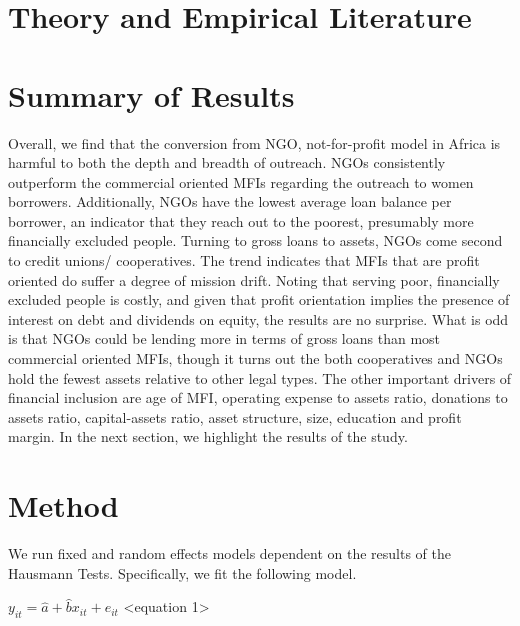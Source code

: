 \documentclass[
]{article}
\begin{document}
\hypertarget{theory-and-empirical-literature}{%
\section{\texorpdfstring{\textbf{Theory and Empirical
Literature}}{Theory and Empirical Literature}}\label{theory-and-empirical-literature}}

\hypertarget{summary-of-results}{%
\section{\texorpdfstring{\textbf{Summary of
Results}}{Summary of Results}}\label{summary-of-results}}

Overall, we find that the conversion from NGO, not-for-profit model in
Africa is harmful to both the depth and breadth of outreach. NGOs
consistently outperform the commercial oriented MFIs regarding the
outreach to women borrowers. Additionally, NGOs have the lowest average
loan balance per borrower, an indicator that they reach out to the
poorest, presumably more financially excluded people. Turning to gross
loans to assets, NGOs come second to credit unions/ cooperatives. The
trend indicates that MFIs that are profit oriented do suffer a degree of
mission drift. Noting that serving poor, financially excluded people is
costly, and given that profit orientation implies the presence of
interest on debt and dividends on equity, the results are no surprise.
What is odd is that NGOs could be lending more in terms of gross loans
than most commercial oriented MFIs, though it turns out the both
cooperatives and NGOs hold the fewest assets relative to other legal
types. The other important drivers of financial inclusion are age of
MFI, operating expense to assets ratio, donations to assets ratio,
capital-assets ratio, asset structure, size, education and profit
margin. In the next section, we highlight the results of the study.

\hypertarget{method}{%
\section{\texorpdfstring{\textbf{Method}}{Method}}\label{method}}

We run fixed and random effects models dependent on the results of the
Hausmann Tests. Specifically, we fit the following model.

\(y_{it} = \hat{a} + \hat{b}x_{it} + e_{it}\) \textless equation
1\textgreater{}
\end{document}
